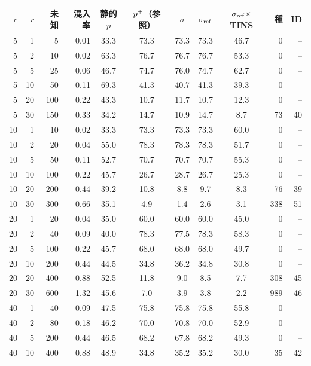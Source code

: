 {\fontsize{6.2pt}{7.2pt}\selectfont\renewcommand{\arraystretch}{1.0}%
\setlength{\tabcolsep}{2.6pt}\begin{tabular}{@{}rrrr|ccccc|rr@{}}
\hline
\rule[-2.0pt]{0pt}{8.2pt}$c$ & $r$ & 未知 & 混入率 & 静的$p$ & $p^{+}$（参照） & $\sigma$ & $\sigma_{\mathrm{ref}}$ & $\sigma_{\mathrm{ref}}\times$TINS & 種 & ID \\
\hline
5 & 1 & 5 & 0.01 & 33.3 & 73.3 & 73.3 & 73.3 & 46.7 & 0 & -- \\
5 & 2 & 10 & 0.02 & 63.3 & 76.7 & 76.7 & 76.7 & 53.3 & 0 & -- \\
5 & 5 & 25 & 0.06 & 46.7 & 74.7 & 76.0 & 74.7 & 62.7 & 0 & -- \\
5 & 10 & 50 & 0.11 & 69.3 & 41.3 & 40.7 & 41.3 & 39.3 & 0 & -- \\
5 & 20 & 100 & 0.22 & 43.3 & 10.7 & 11.7 & 10.7 & 12.3 & 0 & -- \\
5 & 30 & 150 & 0.33 & 34.2 & 14.7 & 10.9 & 14.7 & 8.7 & 73 & 40 \\
10 & 1 & 10 & 0.02 & 33.3 & 73.3 & 73.3 & 73.3 & 60.0 & 0 & -- \\
10 & 2 & 20 & 0.04 & 55.0 & 78.3 & 78.3 & 78.3 & 51.7 & 0 & -- \\
10 & 5 & 50 & 0.11 & 52.7 & 70.7 & 70.7 & 70.7 & 55.3 & 0 & -- \\
10 & 10 & 100 & 0.22 & 45.7 & 26.7 & 28.7 & 26.7 & 25.3 & 0 & -- \\
10 & 20 & 200 & 0.44 & 39.2 & 10.8 & 8.8 & 9.7 & 8.3 & 76 & 39 \\
10 & 30 & 300 & 0.66 & 35.1 & 4.9 & 1.4 & 2.6 & 3.1 & 338 & 51 \\
20 & 1 & 20 & 0.04 & 35.0 & 60.0 & 60.0 & 60.0 & 45.0 & 0 & -- \\
20 & 2 & 40 & 0.09 & 40.0 & 78.3 & 77.5 & 78.3 & 58.3 & 0 & -- \\
20 & 5 & 100 & 0.22 & 45.7 & 68.0 & 68.0 & 68.0 & 49.7 & 0 & -- \\
20 & 10 & 200 & 0.44 & 44.5 & 34.8 & 36.2 & 34.8 & 30.8 & 0 & -- \\
20 & 20 & 400 & 0.88 & 52.5 & 11.8 & 9.0 & 8.5 & 7.7 & 308 & 45 \\
20 & 30 & 600 & 1.32 & 45.6 & 7.0 & 3.9 & 3.8 & 2.2 & 989 & 46 \\
40 & 1 & 40 & 0.09 & 47.5 & 75.8 & 75.8 & 75.8 & 55.8 & 0 & -- \\
40 & 2 & 80 & 0.18 & 46.2 & 70.0 & 70.8 & 70.0 & 52.9 & 0 & -- \\
40 & 5 & 200 & 0.44 & 46.5 & 68.2 & 67.8 & 68.2 & 49.3 & 0 & -- \\
40 & 10 & 400 & 0.88 & 48.9 & 34.8 & 35.2 & 35.2 & 30.0 & 35 & 42 \\

\end{tabular}}
